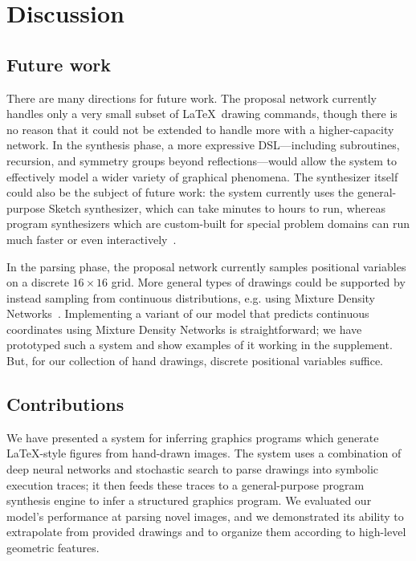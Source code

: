 \documentclass{article}
\begin{document}
\section{Discussion}

\subsection{Future work}
There are many directions for future work. The proposal network  currently handles only a very small subset of \LaTeX~drawing commands, though there is no reason that it could not be extended to handle more with a higher-capacity network.
In the synthesis phase, a more expressive DSL---including subroutines, recursion, and symmetry groups beyond reflections---would allow the system to effectively model a wider variety of graphical phenomena. The synthesizer itself could also be the subject of future work: the system currently uses the general-purpose Sketch synthesizer, which can take minutes to hours to run, whereas program synthesizers which are custom-built for special problem domains can run much faster or even interactively~\cite{le2014flashextract}.

In the parsing phase, the proposal network currently samples positional variables on a discrete $16\times 16$ grid. More general types of drawings could be supported by instead sampling from continuous distributions, e.g. using Mixture Density Networks~\cite{MDN}.
Implementing a variant of our model that predicts continuous coordinates
using Mixture Density Networks is straightforward;
we have prototyped such a system and
show examples of it working in the supplement.
But, for our collection of hand drawings, discrete positional variables suffice.


\subsection{Contributions}

We have presented a system for inferring graphics programs which generate \LaTeX-style figures from hand-drawn images. The system uses a combination of deep neural networks and stochastic search to parse drawings into symbolic execution traces; it then feeds these traces to a general-purpose program synthesis engine to infer a structured graphics program. We evaluated our model's performance at parsing novel images, and we demonstrated its ability to extrapolate from provided drawings and to organize them according to high-level geometric features.
\end{document}
